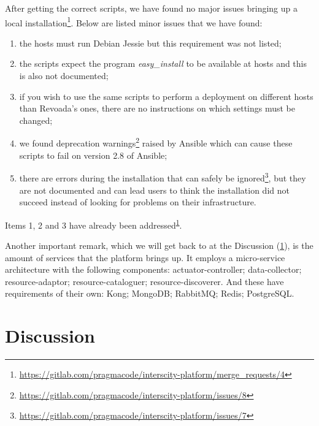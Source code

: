\documentclass[paper=a4, fontsize=11pt]{scrartcl}
\numberwithin{equation}{section}    %
\numberwithin{figure}{section}      %
\numberwithin{table}{section}        %
\begin{document}
  After getting the correct scripts, we have found no major issues bringing up a local installation\footnote{\label{installation-mr}\url{https://gitlab.com/pragmacode/interscity-platform/merge_requests/4}}. Below are listed minor issues that we have found:

  \begin{enumerate}
    \item the hosts must run Debian Jessie but this requirement was not listed;
    \item the scripts expect the program \textit{easy\_install} to be available at hosts and this is also not documented;
    \item if you wish to use the same scripts to perform a deployment on different hosts than Revoada's ones, there are no instructions on which settings must be changed;
    \item we found deprecation warnings\footnote{\url{https://gitlab.com/pragmacode/interscity-platform/issues/8}} raised by Ansible which can cause these scripts to fail on version 2.8 of Ansible;
    \item there are errors during the installation that can safely be ignored\footnote{\url{https://gitlab.com/pragmacode/interscity-platform/issues/7}}, but they are not documented and can lead users to think the installation did not succeed instead of looking for problems on their infrastructure.
  \end{enumerate}

  Items 1, 2 and 3 have already been addressed\textsuperscript{\ref{installation-mr}}.

  Another important remark, which we will get back to at the Discussion (\ref{sec:discussion}), is the amount of services that the platform brings up. It employs a micro-service architecture with the following components: actuator-controller; data-collector; resource-adaptor; resource-cataloguer; resource-discoverer. And these have requirements of their own: Kong; MongoDB; RabbitMQ; Redis; PostgreSQL.

  \section{Discussion}
  \label{sec:discussion}
\end{document}
